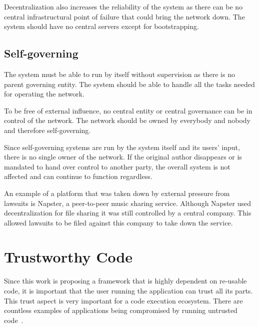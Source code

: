 Decentralization also increases the reliability of the system as there can be no central infrastructural point of failure that could bring the network down. The system should have no central servers except for bootstrapping.

\subsection*{Self-governing}

The system must be able to run by itself without supervision as there is no parent governing entity. The system should be able to handle all the tasks needed for operating the network.

To be free of external influence, no central entity or central governance can be in control of the network. The network should be owned by everybody and nobody and therefore self-governing.

Since self-governing systems are run by the system itself and its users' input, there is no single owner of the network. If the original author disappears or is mandated to hand over control to another party, the overall system is not affected and can continue to function regardless.

An example of a platform that was taken down by external pressure from lawsuits is Napster, a peer-to-peer music sharing service\cite{mccourt2003creators}. Although Napster used decentralization for file sharing it was still controlled by a central company. This allowed lawsuits to be filed against this company to take down the service.

\section{Trustworthy Code}


Since this work is proposing a framework that is highly dependent on re-usable code, it is important that the user running the application can trust all its parts. This trust aspect is very important for a code execution ecosystem. There are countless examples of applications being compromised by running untrusted code~\cite{purescript}\cite{docker}.

